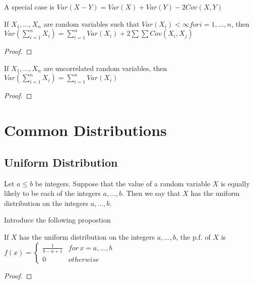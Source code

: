 A special case is $Var\left(X-Y\right)=Var\left(X\right)+Var\left(Y\right)-2Cov\left(X,Y\right)$

\begin{proposition}
If $X_{1},\ldots,X_{n}$ are random variables such that $Var\left(X_{i}\right)<\infty for i=1,\ldots,n$, then $Var\left(\sum_{i=1}^{n}X_{i}\right)=\sum_{i=1}^{n}Var\left(X_{i}\right)+2\sum\sum Cov\left(X_{i},X_{j}\right)$
\end{proposition}
\begin{proof}
\end{proof}

\begin{proposition}
If $X_{1},\ldots,X_{n}$ are uncorrelated random variables, then $Var\left(\sum_{i=1}^{n}X_{i}\right)=\sum_{i=1}^{n}Var\left(X_{i}\right)$
\end{proposition}
\begin{proof}
\end{proof}


%
%

\section{Common Distributions}
\label{sec:probability_distributions}


\subsection{Uniform Distribution}

\begin{definition}
Let $a \leq b$ be integers. Suppose that the value of a random variable $X$ is equally likely to be each of the integers $a, \ldots, b$. Then we say that $X$ has the uniform distribution on the integers $a, \ldots, b$.
\end{definition}

{\color{red} Introduce the following propostion}

\begin{proposition}
If $X$ has the uniform distribution on the integers $a,\ldots,b$, the p.f. of $X$ is $f\left(x\right)=\begin{cases}
\frac{1}{b-a+1} & for\,x=a,\ldots,b\\
0 & otherwise
\end{cases}$
\end{proposition}
\begin{proof}
\end{proof}

